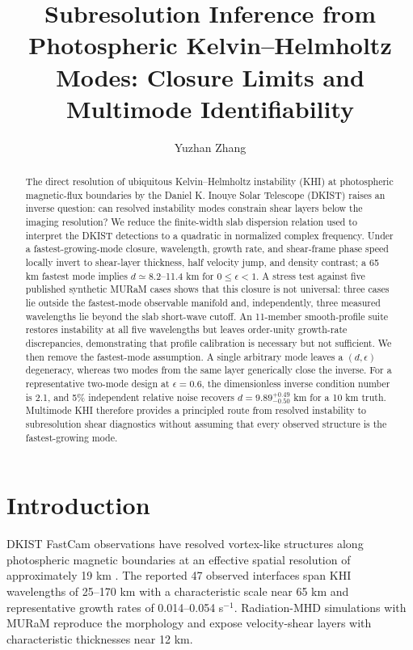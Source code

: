 \documentclass[linenumbers]{aastex7}
\begin{document}
\title{Subresolution Inference from Photospheric Kelvin--Helmholtz Modes: Closure Limits and Multimode Identifiability}

\author{Yuzhan Zhang}

\begin{abstract}
The direct resolution of ubiquitous Kelvin--Helmholtz instability (KHI) at photospheric magnetic-flux boundaries by the Daniel K. Inouye Solar Telescope (DKIST) raises an inverse question: can resolved instability modes constrain shear layers below the imaging resolution? We reduce the finite-width slab dispersion relation used to interpret the DKIST detections to a quadratic in normalized complex frequency. Under a fastest-growing-mode closure, wavelength, growth rate, and shear-frame phase speed locally invert to shear-layer thickness, half velocity jump, and density contrast; a 65 km fastest mode implies $d\simeq8.2$--11.4 km for $0\leq\epsilon<1$. A stress test against five published synthetic MURaM cases shows that this closure is not universal: three cases lie outside the fastest-mode observable manifold and, independently, three measured wavelengths lie beyond the slab short-wave cutoff. An 11-member smooth-profile suite restores instability at all five wavelengths but leaves order-unity growth-rate discrepancies, demonstrating that profile calibration is necessary but not sufficient. We then remove the fastest-mode assumption. A single arbitrary mode leaves a $(d,\epsilon)$ degeneracy, whereas two modes from the same layer generically close the inverse. For a representative two-mode design at $\epsilon=0.6$, the dimensionless inverse condition number is 2.1, and 5\% independent relative noise recovers $d=9.89^{+0.49}_{-0.50}$ km for a 10 km truth. Multimode KHI therefore provides a principled route from resolved instability to subresolution shear diagnostics without assuming that every observed structure is the fastest-growing mode.
\end{abstract}

\section{Introduction}
DKIST FastCam observations have resolved vortex-like structures along photospheric magnetic boundaries at an effective spatial resolution of approximately 19 km \citep{Kuridze2026}. The reported 47 observed interfaces span KHI wavelengths of 25--170 km with a characteristic scale near 65 km and representative growth rates of 0.014--0.054 s$^{-1}$. Radiation-MHD simulations with MURaM reproduce the morphology and expose velocity-shear layers with characteristic thicknesses near 12 km.
\end{document}

